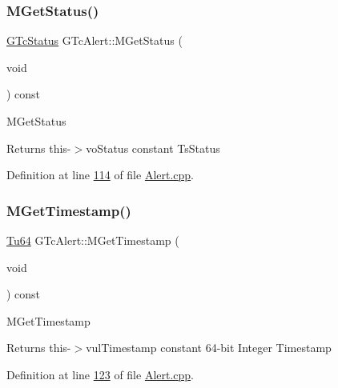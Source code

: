 \subsubsection{\texorpdfstring{M\+Get\+Status()}{MGetStatus()}}
{\footnotesize\ttfamily \mbox{\hyperlink{class_g_n_common_1_1_g_n_notification_1_1_g_tc_status}{G\+Tc\+Status}} G\+Tc\+Alert\+::\+M\+Get\+Status (\begin{DoxyParamCaption}\item[{void}]{ }\end{DoxyParamCaption}) const}

M\+Get\+Status \begin{DoxyReturn}{Returns}
this-\/$>$vo\+Status constant Ts\+Status 
\end{DoxyReturn}


Definition at line \mbox{\hyperlink{_alert_8cpp_source_l00114}{114}} of file \mbox{\hyperlink{_alert_8cpp_source}{Alert.\+cpp}}.

\mbox{\label{class_g_n_common_1_1_g_n_notification_1_1_g_tc_alert_a490bb2fc3356e611086e412c87c07fb8}} 
\subsubsection{\texorpdfstring{M\+Get\+Timestamp()}{MGetTimestamp()}}
{\footnotesize\ttfamily \mbox{\hyperlink{namespace_g_n_common_a9404ee6090c788ae70aebd1436ceb97d}{Tu64}} G\+Tc\+Alert\+::\+M\+Get\+Timestamp (\begin{DoxyParamCaption}\item[{void}]{ }\end{DoxyParamCaption}) const}

M\+Get\+Timestamp \begin{DoxyReturn}{Returns}
this-\/$>$vul\+Timestamp constant 64-\/bit Integer Timestamp 
\end{DoxyReturn}


Definition at line \mbox{\hyperlink{_alert_8cpp_source_l00123}{123}} of file \mbox{\hyperlink{_alert_8cpp_source}{Alert.\+cpp}}.

\mbox{\label{class_g_n_common_1_1_g_n_notification_1_1_g_tc_alert_a5b9fab9fd3113139d4a63894cd3758c9}} 

